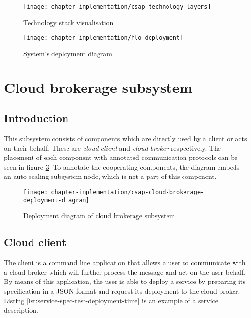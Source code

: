 \begin{figure}[!ht]
  \begin{center}
    \texttt{[image: chapter-implementation/csap-technology-layers]}
  \end{center}
  \caption{Technology stack visualisation}
  \label{fig:csap-technology layers}
\end{figure}

\begin{figure}[!ht]
  \begin{center}
    \texttt{[image: chapter-implementation/hlo-deployment]}
  \end{center}
  \caption{System's deployment diagram}
  \label{fig:hlo-deployment}
\end{figure}

\section{Cloud brokerage subsystem}
\subsection{Introduction}
This subsystem consists of components which are directly used by a client or acts on their behalf. These are \emph{cloud client} and \emph{cloud broker} respectively. The placement of each component with annotated communication protocols can be seen in figure \ref{fig:csap-cloud-brokerage-deployment-diagram}. To annotate the cooperating components, the diagram embeds an auto-scaling subsystem node, which is not a part of this component.

\begin{figure}[!ht]
  \begin{center}
    \texttt{[image: chapter-implementation/csap-cloud-brokerage-deployment-diagram]}
  \end{center}
   \caption{Deployment diagram of cloud brokerage subsystem}
  \label{fig:csap-cloud-brokerage-deployment-diagram}
\end{figure}

\subsection{Cloud client}
The client is a command line application that allows a user to communicate with a cloud broker which will further process the message and act on the user behalf. By means of this application, the user is able to deploy a service by preparing its specification in a JSON format and request its deployment to the cloud broker. Listing \ref{lst:service-spec-test-deployment-time} is an example of a service description.

